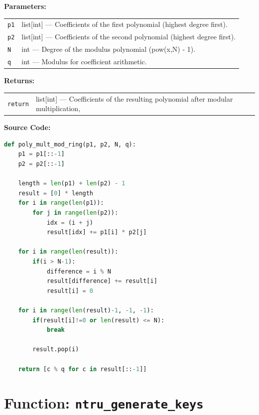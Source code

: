 \documentclass[a4paper,12pt]{article}
\begin{document}
\vspace{1em}

\textbf{Parameters:}

\vspace{1em}
\noindent
\begin{tabular}{p{3cm} p{11cm}}
\texttt{p1} & list[int] — Coefficients of the first polynomial (highest degree first). \\
\texttt{p2} & list[int] — Coefficients of the second polynomial (highest degree first). \\
\texttt{N} & int — Degree of the modulus polynomial (pow(x,N) - 1). \\
\texttt{q} & int — Modulus for coefficient arithmetic. \\
\end{tabular}

\vspace{1em}
\noindent
\textbf{Returns:}

\begin{tabular}{p{3cm} p{11cm}}
\texttt{return} & list[int] — Coefficients of the resulting polynomial after modular multiplication, \\
\end{tabular}

\vspace{1em}
\textbf{Source Code:}

\begin{lstlisting}[language=Python]
def poly_mult_mod_ring(p1, p2, N, q):
    p1 = p1[::-1]
    p2 = p2[::-1]

    length = len(p1) + len(p2) - 1
    result = [0] * length
    for i in range(len(p1)):
        for j in range(len(p2)):
            idx = (i + j)
            result[idx] += p1[i] * p2[j]

    for i in range(len(result)):
        if(i > N-1):
            difference = i % N
            result[difference] += result[i]
            result[i] = 0

    for i in range(len(result)-1, -1, -1):
        if(result[i]!=0 or len(result) <= N):
            break

        result.pop(i)

    return [c % q for c in result[::-1]]
\end{lstlisting}

\section*{Function: \texttt{ntru\_generate\_keys}}
\end{document}
